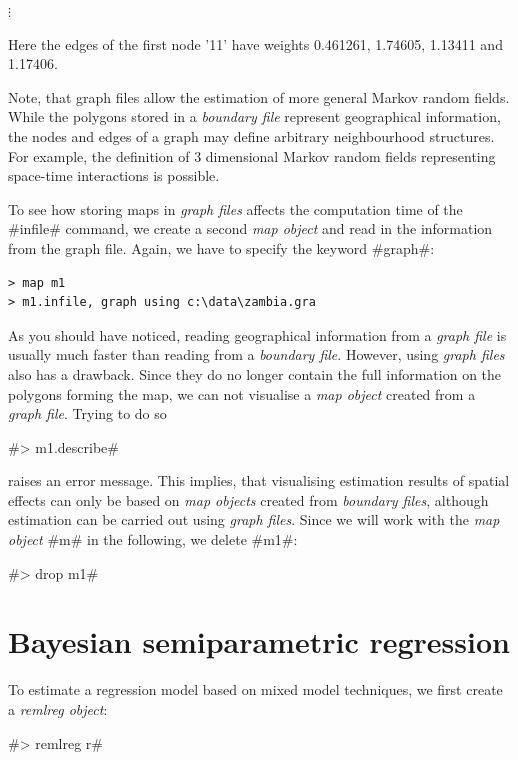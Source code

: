 \documentclass{article}
\begin{document}
\hspace{1cm} $\vdots$

\normalsize

\vspace{0.5cm}

Here the edges of the first node '11' have weights 0.461261,
1.74605, 1.13411 and 1.17406.

Note, that graph files allow the estimation of more general Markov
random fields. While the polygons stored in a {\em boundary file}
represent geographical information, the nodes and edges of a graph
may define arbitrary neighbourhood structures. For example, the
definition of 3 dimensional Markov random fields representing
space-time interactions is possible.

To see how storing maps in {\it graph files} affects the
computation time of the #infile# command, we create a second {\it
map object} and read in the information from the graph file.
Again, we have to specify the keyword #graph#:

\begin{verbatim}
> map m1
> m1.infile, graph using c:\data\zambia.gra
\end{verbatim}

As you should have noticed, reading geographical information from
a {\it graph file} is usually much faster than reading from a {\it
boundary file}. However, using {\it graph files} also has a
drawback. Since they do no longer contain the full information on
the polygons forming the map, we can not visualise a {\it map
object} created from a {\it graph file}. Trying to do so

#> m1.describe#

raises an error message. This implies, that visualising estimation
results of spatial effects can only be based on {\it map objects}
created from {\it boundary files}, although estimation can be
carried out using {\it graph files}. Since we will work with the
{\it map object} #m# in the following, we delete #m1#:

#> drop m1#

\section{Bayesian semiparametric regression}\label{regression}

To estimate a regression model based on mixed model techniques, we
first create a {\it remlreg object}:

#> remlreg r#
\end{document}
